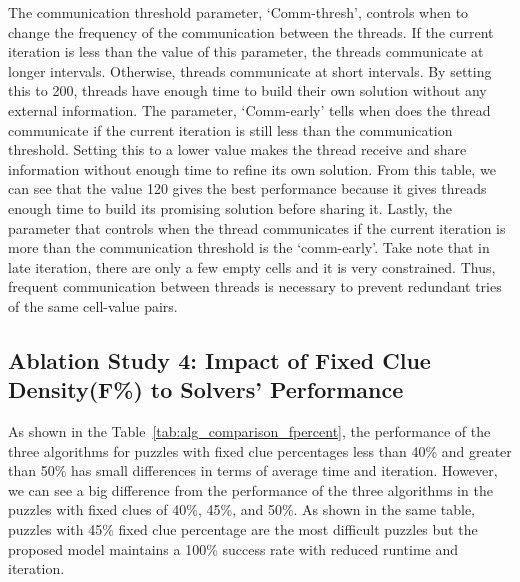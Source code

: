 The communication threshold parameter, `Comm-thresh', controls when to change the frequency of the communication between the threads. If the current iteration is less than the value of this parameter, the threads communicate at longer intervals. Otherwise, threads communicate at short intervals. By setting this to 200, threads have enough time to build their own solution without any external information. The parameter, `Comm-early' tells when does the thread communicate if the current iteration is still less than the communication threshold. Setting this to a lower value makes the thread receive and share information without enough time to refine its own solution. From this table, we can see that the value 120 gives the best performance because it gives threads enough time to build its promising solution before sharing it. Lastly, the parameter that controls when the thread communicates if the current iteration is more than the communication threshold is the `comm-early'. Take note that in late iteration, there are only a few empty cells and it is very constrained. Thus, frequent communication between threads is necessary to prevent redundant tries of the same cell-value pairs. 


\subsection{Ablation Study 4: Impact of Fixed Clue Density(F\%) to Solvers' Performance}
As shown in the Table~\ref{tab:alg_comparison_fpercent}, the performance of the three algorithms for puzzles with fixed clue percentages less than 40\% and greater than 50\% has small differences in terms of average time and iteration. However, we can see a big difference from the performance of the three algorithms in the puzzles with fixed clues of 40\%, 45\%, and 50\%. As shown in the same table, puzzles with 45\% fixed clue percentage are the most difficult puzzles but the proposed model maintains a 100\% success rate with reduced runtime and iteration. 

